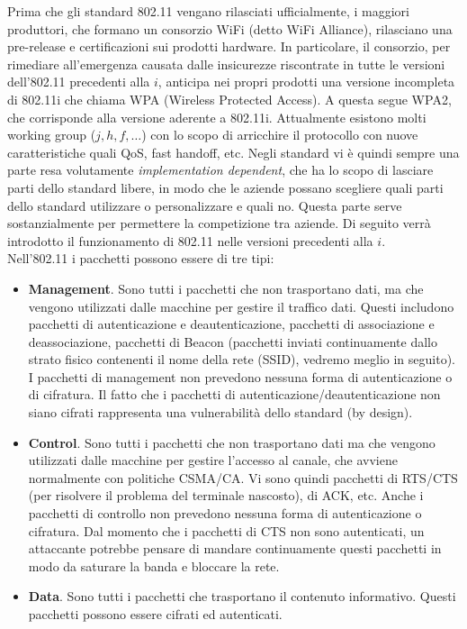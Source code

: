 Prima che gli standard 802.11 vengano rilasciati ufficialmente, i maggiori produttori, che formano un consorzio WiFi (detto WiFi Alliance), rilasciano una pre-release e certificazioni sui prodotti hardware. In particolare, il consorzio, per rimediare all'emergenza causata dalle insicurezze riscontrate in tutte le versioni dell'802.11 precedenti alla $i$, anticipa nei propri prodotti una versione incompleta di 802.11i che chiama WPA (Wireless Protected Access). A questa segue WPA2, che corrisponde alla versione aderente a 802.11i. Attualmente esistono molti working group ($j,h,f,\dots$) con lo scopo di arricchire il protocollo con nuove caratteristiche quali QoS, fast handoff, etc. Negli standard vi è quindi sempre una parte resa volutamente \textit{implementation dependent}, che ha lo scopo di lasciare parti dello standard libere, in modo che le aziende possano scegliere quali parti dello standard utilizzare o personalizzare e quali no. Questa parte serve sostanzialmente per permettere la competizione tra aziende. Di seguito verrà introdotto il funzionamento di 802.11 nelle versioni precedenti alla $i$.\\
Nell'802.11 i pacchetti possono essere di tre tipi:
\begin{itemize}
	\item \textbf{Management}. Sono tutti i pacchetti che non trasportano dati, ma che vengono utilizzati dalle macchine per gestire il traffico dati. Questi includono pacchetti di autenticazione e deautenticazione, pacchetti di associazione e deassociazione, pacchetti di Beacon (pacchetti inviati continuamente dallo strato fisico contenenti il nome della rete (SSID), vedremo meglio in seguito). I pacchetti di management non prevedono nessuna forma di autenticazione o di cifratura. Il fatto che i pacchetti di autenticazione/deautenticazione non siano cifrati rappresenta una vulnerabilità dello standard (by design).
	\item \textbf{Control}. Sono tutti i pacchetti che non trasportano dati ma che vengono utilizzati dalle macchine per gestire l'accesso al canale, che avviene normalmente con politiche CSMA/CA. Vi sono quindi pacchetti di RTS/CTS (per risolvere il problema del terminale nascosto), di ACK, etc. Anche i pacchetti di controllo non prevedono nessuna forma di autenticazione o cifratura. Dal momento che i pacchetti di CTS non sono autenticati, un attaccante potrebbe pensare di mandare continuamente questi pacchetti in modo da saturare la banda e bloccare la rete.
	\item \textbf{Data}. Sono tutti i pacchetti che trasportano il contenuto informativo. Questi pacchetti possono essere cifrati ed autenticati.
\end{itemize}
